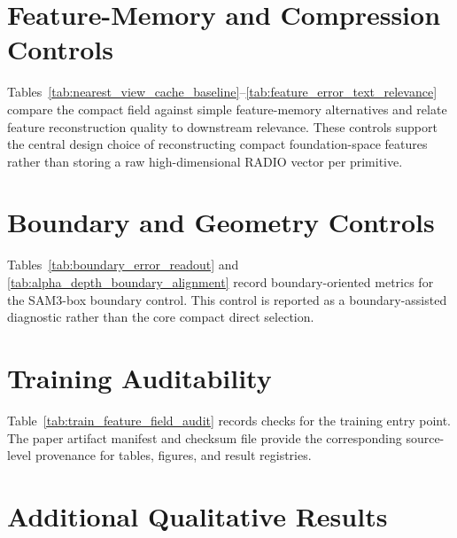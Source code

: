 \documentclass[10pt,journal,onecolumn]{IEEEtran}
\begin{document}






\clearpage
\section{Feature-Memory and Compression Controls}

Tables~\ref{tab:nearest_view_cache_baseline}--\ref{tab:feature_error_text_relevance}
compare the compact field against simple feature-memory alternatives and relate
feature reconstruction quality to downstream relevance. These controls support
the central design choice of reconstructing compact foundation-space features
rather than storing a raw high-dimensional RADIO vector per primitive.









\section{Boundary and Geometry Controls}

Tables~\ref{tab:boundary_error_readout} and
\ref{tab:alpha_depth_boundary_alignment} record boundary-oriented metrics for
the SAM3-box boundary control. This control is reported as a boundary-assisted
diagnostic rather than the core compact direct selection.





\section{Training Auditability}

Table~\ref{tab:train_feature_field_audit} records checks for the training entry
point. The paper artifact manifest and checksum file provide the corresponding
source-level provenance for tables, figures, and result registries.



\clearpage
\section{Additional Qualitative Results}
\end{document}
